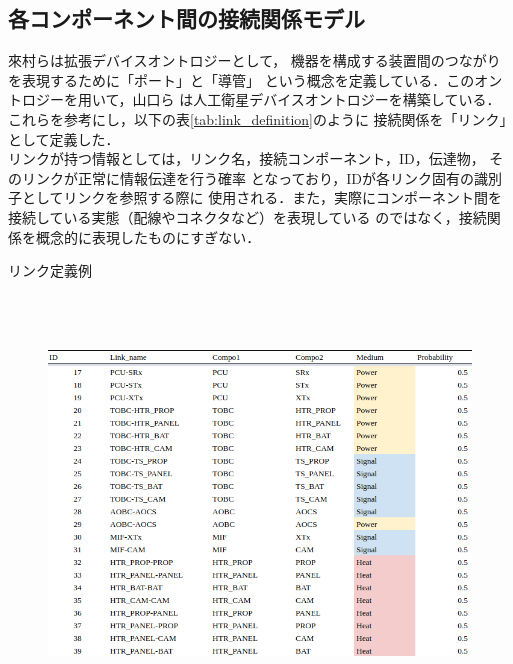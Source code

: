 \documentclass[11pt]{jsreport}
\begin{document}
\subsection{各コンポーネント間の接続関係モデル}
來村ら\cite{Kitamura01}は拡張デバイスオントロジーとして，
機器を構成する装置間のつながりを表現するために「ポート」と「導管」%
という概念を定義している．このオントロジーを用いて，山口ら\cite{Yamaguchi2014}
は人工衛星デバイスオントロジーを構築している．
これらを参考にし，以下の表\ref{tab:link_definition}のように
接続関係を「リンク」として定義した．\\%
リンクが持つ情報としては，リンク名，接続コンポーネント，ID，伝達物，
そのリンクが正常に情報伝達を行う確率%
となっており，IDが各リンク固有の識別子としてリンクを参照する際に
使用される．また，実際にコンポーネント間を接続している実態（配線やコネクタなど）を表現している
のではなく，接続関係を概念的に表現したものにすぎない．

\begin{table}[H]
   \centering
   \caption{リンク定義例}
   \label{tab:link_definition}
\end{table} 
\vspace{-2zh}
\begin{figure}[H]
   \centering
      \includegraphics[height=11cm]{figure/link_definition.png}
\end{figure}
\end{document}
